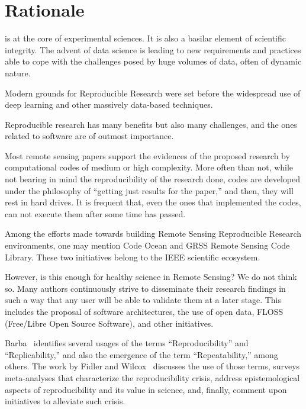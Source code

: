 \documentclass[journal,twoside]{IEEEtran}
\begin{document}
\IEEEpeerreviewmaketitle

\section{Rationale}\label{Sec:Introduction}

 is at the core of experimental sciences. 
It is also a basilar element of scientific integrity. 
The advent of data science is leading to new requirements and practices able to cope with the challenges posed by huge volumes of data, often of dynamic nature. 

Modern grounds for Reproducible Research were set before the widespread use of deep learning and other massively data-based techniques.

Reproducible research has many benefits but also many challenges, and the ones related to software are of outmost importance.

Most remote sensing papers support the evidences of the proposed research by computational codes of medium or high complexity. 
More often than not, while not bearing in mind the reproducibility of the research done, codes are developed under the philosophy of ``getting just results for the paper,'' and then, they will rest in hard drives. 
It is frequent that, even the ones that implemented the codes, can not execute them after some time has passed.  

Among the efforts made towards building Remote Sensing Reproducible Research environments, one may mention Code Ocean and GRSS Remote Sensing Code Library. 
These two initiatives belong to the IEEE scientific ecosystem. 

However, is this enough for healthy science in Remote Sensing? 
We do not think so. 
Many authors continuously strive to disseminate their research findings in such a way that any user will be able to validate them at a later stage. 
This includes the proposal of software architectures, the use of open data, FLOSS (Free/Libre Open Source Software), and other initiatives.

Barba~\cite{TerminologiesforReproducibleResearch} identifies several usages of the terms ``Reproducibility'' and ``Replicability,'' and also the emergence of the term ``Repeatability,'' among others.
The work by Fidler and Wilcox~\cite{ReproducibilityofScientificResults2018} discusses the use of those terms, surveys meta-analyses that characterize the reproducibility crisis, address epistemological aspects of reproducibility and its value in science, and, finally, comment upon initiatives to alleviate such crisis.
\end{document}
